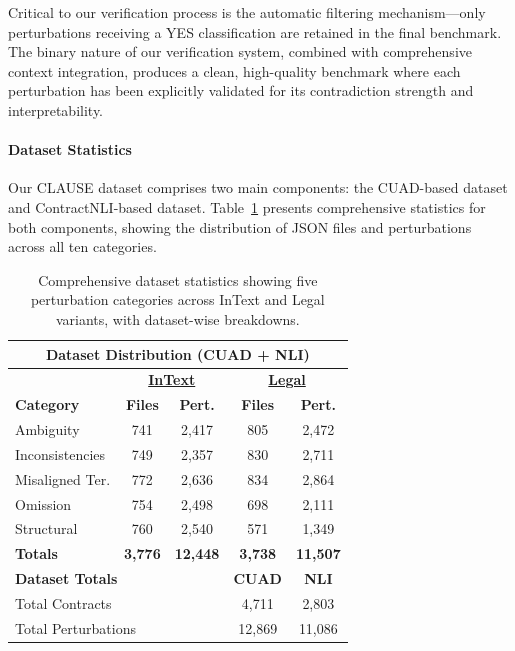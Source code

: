 \documentclass[11pt]{article}
\newcommand{\datasetName}{{\sc CLAUSE}\xspace}
\begin{document}
Critical to our verification process is the automatic filtering mechanism—only perturbations receiving a YES classification are retained in the final benchmark. The binary nature of our verification system, combined with comprehensive context integration, produces a clean, high-quality benchmark where each perturbation has been explicitly validated for its contradiction strength and interpretability.

\paragraph{Dataset Statistics}

Our \datasetName dataset comprises two main components: the CUAD-based dataset and ContractNLI-based dataset. Table~\ref{tab:combined_dataset_summary} presents comprehensive statistics for both components, showing the distribution of JSON files and perturbations across all ten categories.

\begin{table}[h]
\centering
\renewcommand{\arraystretch}{1.0}
\setlength{\tabcolsep}{5pt}
{\small
\begin{tabular}{p{2.0cm}cccc}
\toprule
\multicolumn{5}{c}{\textbf{Dataset Distribution (CUAD + NLI)}} \\
\midrule
& \multicolumn{2}{c}{\underline{\textbf{InText}}} & \multicolumn{2}{c}{\underline{\textbf{Legal}}} \\
\textbf{Category} & \textbf{Files} & \textbf{Pert.} & \textbf{Files} & \textbf{Pert.} \\
\midrule
Ambiguity          & 741 & 2,417 & 805 & 2,472 \\
Inconsistencies    & 749 & 2,357 & 830 & 2,711 \\
Misaligned Ter.   & 772 & 2,636 & 834 & 2,864 \\
Omission           & 754 & 2,498 & 698 & 2,111 \\
Structural   & 760 & 2,540 & 571 & 1,349 \\
\midrule
\textbf{Totals}   & \textbf{3,776} & \textbf{12,448} & \textbf{3,738} & \textbf{11,507} \\
\midrule
\multicolumn{3}{l}{\textbf{Dataset Totals}} & \textbf{CUAD} & \textbf{NLI} \\
\multicolumn{3}{l}{Total Contracts} & 4,711 & 2,803 \\
\multicolumn{3}{l}{Total Perturbations} & 12,869 & 11,086 \\
\bottomrule
\end{tabular}
}
\caption{Comprehensive dataset statistics showing five perturbation categories across InText and Legal variants, with dataset-wise breakdowns.}
\label{tab:combined_dataset_summary}
\end{table}
\end{document}

